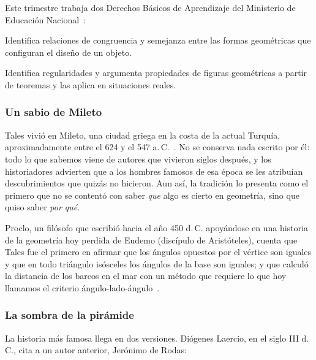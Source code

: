 \documentclass[11pt]{article}
\begin{document}
Este trimestre trabaja dos Derechos Básicos de Aprendizaje del Ministerio de
Educación Nacional~\cite{mendba}:

\begin{dba}
Identifica relaciones de congruencia y semejanza entre las formas
geométricas que configuran el diseño de un objeto.
\end{dba}

\begin{dba}
Identifica regularidades y argumenta propiedades de figuras geométricas a
partir de teoremas y las aplica en situaciones reales.
\end{dba}


\subsubsection*{Un sabio de Mileto}

Tales vivió en Mileto, una ciudad griega en la costa de la actual Turquía,
aproximadamente entre el 624 y el 547 a.\,C.~\cite{mactutorthales}. No se
conserva nada escrito por él: todo lo que sabemos viene de autores que
vivieron siglos después, y los historiadores advierten que a los hombres
famosos de esa época se les atribuían descubrimientos que quizás no
hicieron. Aun así, la tradición lo presenta como el primero que no se
contentó con saber \emph{que} algo es cierto en geometría, sino que quiso
saber \emph{por qué}.

Proclo, un filósofo que escribió hacia el año 450 d.\,C. apoyándose en una
historia de la geometría hoy perdida de Eudemo (discípulo de Aristóteles),
cuenta que Tales fue el primero en afirmar que los ángulos opuestos por el
vértice son iguales y que en todo triángulo isósceles los ángulos de la
base son iguales; y que calculó la distancia de los barcos en el mar con un
método que requiere lo que hoy llamamos el criterio
ángulo-lado-ángulo~\cite{ogrady}.

\subsubsection*{La sombra de la pirámide}

La historia más famosa llega en dos versiones. Diógenes Laercio, en el
siglo III d.\,C., cita a un autor anterior, Jerónimo de Rodas:
\end{document}
